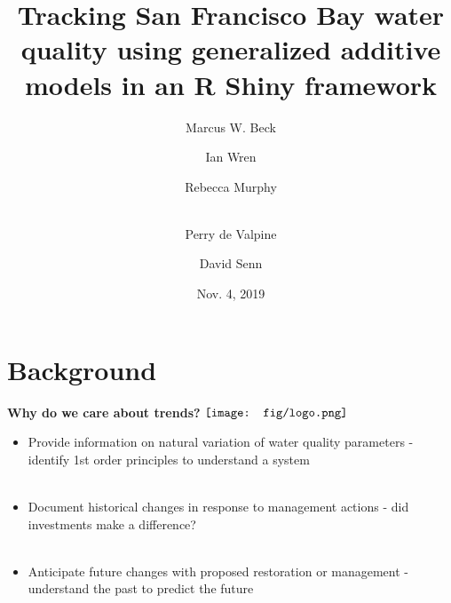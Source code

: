 \documentclass{beamer}
\begin{document}


\title[Tracking SF Bay Water Quality]{Tracking San Francisco Bay water quality using generalized additive models in an R Shiny framework}
\author[Beck et al.]{Marcus W. Beck \and Ian Wren \and Rebecca Murphy \and \\ Perry de Valpine \and David Senn}


\date{Nov. 4, 2019}


\begin{frame}
\titlepage
\end{frame}

\section{Background}

\begin{frame}{\textbf{Why do we care about trends?} \hspace{0pt plus 1 filll} $\vcenter{\hbox{\texttt{[image: fig/logo.png]}}}$}
\begin{itemize}
\item Provide information on natural variation of water quality parameters - identify 1st order principles to understand a system  \\~\\
\item Document historical changes in response to management actions - did investments make a difference? \\~\\
\item Anticipate future changes with proposed restoration or management - understand the past to predict the future
\end{itemize}
\end{frame}
\end{document}
